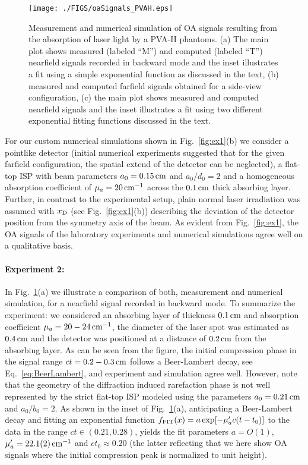 \documentclass[12pt]{iopart}
\begin{document}
\begin{figure}[t!]
\centerline{\texttt{[image: ./FIGS/oaSignals\_PVAH.eps]}} 
\caption{Measurement and numerical simulation of OA signals resulting from the
absorption of laser light by a PVA-H phantoms.  (a) The main plot shows
measured (labeled ``M'') and computed (labeled ``T'') nearfield signals
recorded in backward mode and the inset illustrates a fit using a simple
exponential function as discussed in the text,
(b) measured and computed farfield signals obtained for a side-view configuration,
(c) the main plot shows measured and computed nearfield signals and the inset
illustrates a fit using two different exponential fitting functions discussed
in the text.}

\label{fig:ex2}
\end{figure}

For our custom numerical simulations shown in Fig.\ \ref{fig:ex1}(b) 
we consider a pointlike detector (initial numerical experiments suggested that
for the given farfield configuration, the spatial extend of the detector 
can be neglected), a flat-top ISP with beam parameters 
$a_0=0.15\,{\rm{cm}}$ and $a_0/d_0=2$ and a homogeneous absorption coefficient
of $\mu_a=20\,{\rm{cm}}^{-1}$ across the $0.1\,{\rm{cm}}$ thick absorbing 
layer. 
Further, in contrast to the experimental setup, plain normal laser irradiation
was assumed with $x_{\rm D}$ (see Fig.\ \ref{fig:ex1}(b)) describing the
deviation of the detector position from the symmetry axis of the beam.
As evident from Fig.\ \ref{fig:ex1}, the OA signals of the laboratory
experiments and numerical simulations agree well on a qualitative basis.

\paragraph{Experiment 2:} In Fig.\ \ref{fig:ex2}(a) we illustrate a comparison
of both, measurement and numerical simulation, for a nearfield signal recorded
in backward mode. To summarize the experiment: we considered an absorbing layer
of thickness $0.1\,{\rm{cm}}$ and absorption coefficient
$\mu_a=20-24\,{\rm{cm}}^{-1}$, the diameter of the laser spot was estimated as
$0.4\,{\rm{cm}}$ and the detector was positioned at a distance of $0.2\,{\rm
cm}$ from the absorbing layer.  As can be seen from the figure, the initial
compression phase in the signal range $ct=0.2 - 0.3\,{\rm{cm}}$ follows a
Beer-Lambert decay, see Eq.\ \ref{eq:BeerLambert}, and experiment and
simulation agree well.  However, note that the geometry of the diffraction
induced rarefaction phase is not well represented by the strict flat-top ISP
modeled using the parameters $a_0=0.21\,{\rm{cm}}$ and $a_0/b_0=2$.  As shown
in the inset of Fig.\ \ref{fig:ex2}(a), anticipating a Beer-Lambert decay and
fitting an exponential function $f_{\rm{FIT}}(x)=a \exp[-\mu_{a}^\prime
c(t-t_0)]$ to the data in the range $ct\in(0.21,0.28)$, yields the fit
parameters $a=O(1)$, $\mu_{a}^\prime=22.1(2) \,{\rm{cm}}^{-1}$ and $ct_0\approx
0.20$ (the latter reflecting that we here show OA signals where the initial
compression peak is normalized to unit height).
\end{document}
